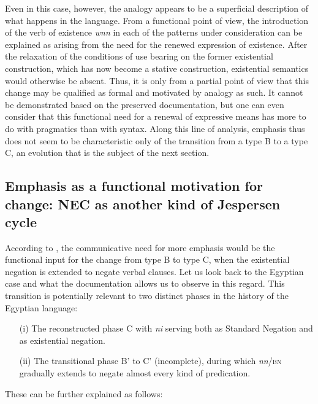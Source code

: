 \documentclass[output=paper,draft,draftmode,colorlinks,citecolor=brown]{langscibook}
\begin{document}
Even in this case, however, the analogy appears to be a superficial description of what happens in the language. From a functional point of view, the introduction of the verb of existence \textit{wnn} in each of the patterns under consideration can be explained as arising from the need for the renewed expression of existence. After the relaxation of the conditions of use bearing on the former existential construction, which has now become a stative construction, existential semantics would otherwise be absent. Thus, it is only from a partial point of view that this change may be qualified as formal and motivated by analogy as such. It cannot be demonstrated based on the preserved documentation, but one can even consider that this functional need for a renewal of expressive means has more to do with pragmatics than with syntax. Along this line of analysis, emphasis thus does not seem to be characteristic only of the transition from a type B to a type C, an evolution that is the subject of the next section.  

\subsection{Emphasis as a functional motivation for change: NEC as another kind of Jespersen cycle}\label{s:AE4-2}

According to \citet{Croft1991}, the communicative need for more emphasis would be the functional input for the change from type B to type C, when the existential negation is extended to negate verbal clauses. Let us look back to the Egyptian case and what the documentation allows us to observe in this regard. This transition is potentially relevant to two distinct phases in the history of the Egyptian language: 
 
\begin{enumerate}
    \item[(i)] The reconstructed phase C with \textit{ni} serving both as Standard Negation and as existential negation.
    \item[(ii)] The transitional phase B’ to C’ (incomplete), during which \textit{nn}/\textsc{bn} gradually extends to negate almost every kind of predication.
\end{enumerate} 

These can be further explained as follows: 
\end{document}
